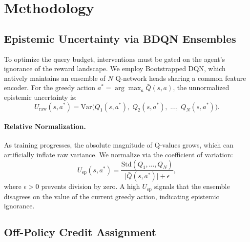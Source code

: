 \documentclass[11pt, a4paper]{article}
\begin{document}
\section{Methodology}

\subsection{Epistemic Uncertainty via BDQN Ensembles}

To optimize the query budget, interventions must be gated on the agent's ignorance of the reward landscape. We employ Bootstrapped DQN, which natively maintains an ensemble of $N$ Q-network heads sharing a common feature encoder. For the greedy action $a^* = \arg\max_a \bar{Q}(s,a)$, the unnormalized epistemic uncertainty is:
\begin{equation}
    U_{\text{raw}}(s, a^*) = \mathrm{Var}\bigl(Q_1(s, a^*),\; Q_2(s, a^*),\; \ldots,\; Q_N(s, a^*)\bigr).
    \label{eq:raw_uncertainty}
\end{equation}

\paragraph{Relative Normalization.}
As training progresses, the absolute magnitude of Q-values grows, which can artificially inflate raw variance. We normalize via the coefficient of variation:
\begin{equation}
    U_{\mathrm{ep}}(s, a^*) = \frac{\mathrm{Std}(Q_1, \ldots, Q_N)}{\bigl|\bar{Q}(s, a^*)\bigr| + \epsilon},
    \label{eq:normalized_uncertainty}
\end{equation}
where $\epsilon > 0$ prevents division by zero. A high $U_{\mathrm{ep}}$ signals that the ensemble disagrees on the value of the current greedy action, indicating epistemic ignorance.

\subsection{Off-Policy Credit Assignment}
\end{document}
